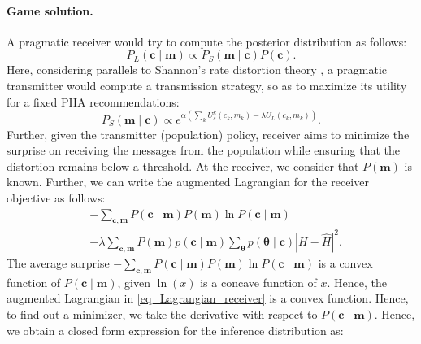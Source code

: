 \documentclass[sigconf,review]{acmart}
\newcommand{\abs}[1]{\left| #1 \right|}
\begin{document}
\paragraph{Game solution.}

A pragmatic receiver would try to compute the posterior distribution as follows:
\begin{equation}
    P_L(\boldsymbol{c}\mid \boldsymbol{m}) \propto P_S(\boldsymbol{m}\mid \boldsymbol{c}) P(\boldsymbol{c}).
\end{equation}
Here, considering parallels to Shannon's rate distortion theory \cite{CoverIT1991}, 
a pragmatic transmitter would compute a transmission strategy, so as to maximize its utility for a fixed PHA recommendations:
\begin{equation}
    P_S(\boldsymbol{m}\mid\boldsymbol{c}) \propto e^{\alpha (\sum\limits_k{U_s^k(c_k,m_k)}      -\lambda U_L(c_k,m_k))}.
\end{equation}
Further, given the transmitter (population) policy, receiver aims to minimize the surprise on receiving the messages from the population while ensuring that the distortion remains below a threshold. 
 At the receiver, we consider that $P(\boldsymbol{m})$ is known. Further, we can write the augmented Lagrangian for the receiver objective as follows:
\begin{equation}
    \begin{aligned}
&-\sum\limits_{\boldsymbol{c},\boldsymbol{m}} P(\boldsymbol{c}\mid \boldsymbol{m})P(\boldsymbol{m}) \ln P(\boldsymbol{c}\mid \boldsymbol{m}) \\
&-\lambda\sum\limits_{\boldsymbol{c},\boldsymbol{m}}P(\boldsymbol{m})p(\boldsymbol{c}\mid\boldsymbol{m})\sum\limits_{\boldsymbol{\theta}}p(\boldsymbol{\theta}\mid \boldsymbol{c})\abs{H - \widehat{H}}^2.
\end{aligned}
\label{eq_Lagrangian_receiver}
\end{equation}
The average surprise $-\sum\limits_{\boldsymbol{c},\boldsymbol{m}} P(\boldsymbol{c}\mid \boldsymbol{m})P(\boldsymbol{m}) \ln P(\boldsymbol{c}\mid \boldsymbol{m})$ is a convex function of $P(\boldsymbol{c}\mid \boldsymbol{m})$, given $\ln (x)$ is a concave function of $x$. Hence, the augmented Lagrangian in \eqref{eq_Lagrangian_receiver} is a convex function. Hence, to find out a minimizer, we take the derivative with respect to $P(\boldsymbol{c}\mid \boldsymbol{m})$. Hence, we obtain a closed form expression for the inference distribution as:
\end{document}
